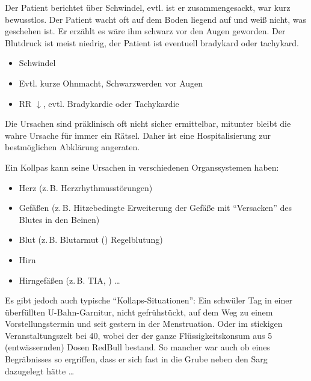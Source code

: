{%
Der Patient berichtet über Schwindel, evtl. ist er
zusammengesackt, war kurz bewusstlos. Der Patient wacht oft
auf dem Boden liegend auf und weiß nicht, was geschehen ist.
Er erzählt  es wäre ihm schwarz vor den Augen geworden. Der
Blutdruck ist meist niedrig, der Patient ist eventuell
bradykard oder tachykard.\bigskip
}{
\begin{itemize}
  \item Schwindel
  \item Evtl. kurze Ohnmacht, Schwarzwerden vor Augen
  \item RR ${\downarrow}$, evtl. Bradykardie oder Tachykardie
\end{itemize}
}{}{}{}




{%
Die Ursachen sind präklinisch oft nicht sicher ermittelbar,
mitunter bleibt die wahre Ursache für immer ein Rätsel.
Daher ist eine Hospitalisierung zur bestmöglichen Abklärung
angeraten.

Ein Kollpas kann seine Ursachen in verschiedenen
Organssystemen haben:

\begin{itemize}
  \item Herz (z.\,B. Herzrhythmusstörungen)
  \item Gefäßen (z.\,B. Hitzebedingte Erweiterung
  der Gefäße mit \enquote{Versacken} des Blutes in den Beinen)
  \item Blut (z.\,B. Blutarmut ()
  Regelblutung)
  \item Hirn
  \item Hirngefäßen (z.\,B. TIA,
   ) \ldots
\end{itemize}

Es gibt jedoch auch typische \enquote{Kollaps-Situationen}: Ein
schwüler Tag in einer überfüllten U-Bahn-Garnitur, nicht
gefrühstückt, auf dem Weg zu einem Vorstellungstermin und
seit gestern in der Menstruation. Oder im stickigen
Veranstaltungszelt bei 40\Deg , wobei der der ganze
Flüssigkeitskonsum aus 5 (entwässernden) Dosen
RedBull{\texttrademark}
bestand. So mancher war auch ob eines Begräbnisses so
ergriffen, dass er sich fast in die Grube neben den Sarg
dazugelegt hätte \ldots 
}{%

}{}{}{}




